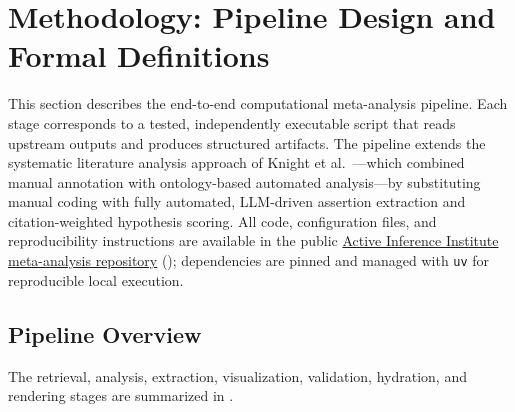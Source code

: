\documentclass[
  english,
]{article}
\begin{document}
\newpage

\section{Methodology: Pipeline Design and Formal
Definitions}\label{sec:methods}

This section describes the end-to-end computational meta-analysis
pipeline. Each stage corresponds to a tested, independently executable
script that reads upstream outputs and produces structured artifacts.
The pipeline extends the systematic literature analysis approach of
Knight et al.~\citep{knight2022fep}---which combined manual annotation
with ontology-based automated analysis---by substituting manual coding
with fully automated, LLM-driven assertion extraction and
citation-weighted hypothesis scoring. All code, configuration files, and
reproducibility instructions are available in the public
\href{https://github.com/ActiveInferenceInstitute/act_inf_metaanalysis}{Active
Inference Institute meta-analysis repository}
(); dependencies
are pinned and managed with \texttt{uv} for reproducible local
execution.

\subsection{Pipeline Overview}\label{pipeline-overview}

The retrieval, analysis, extraction, visualization, validation,
hydration, and rendering stages are summarized in
.
\end{document}

